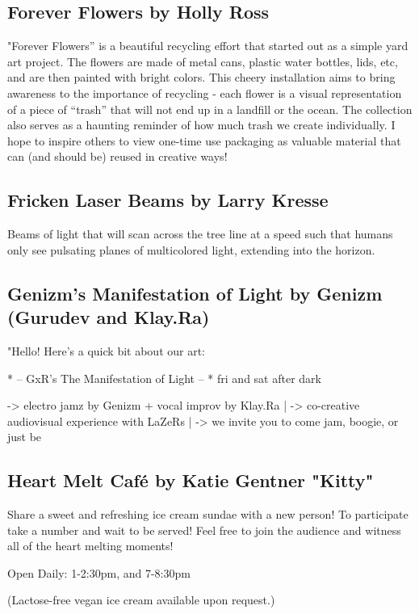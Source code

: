 \begin{multicols}{2}
\subsection*{Forever Flowers by Holly Ross                   }
"Forever Flowers” is a beautiful recycling effort that started out as a simple yard art project.   The flowers are made of metal cans, plastic water bottles, lids, etc, and are then painted with bright colors.  This cheery installation aims to bring awareness to the importance of recycling - each flower is a visual representation of a piece of “trash” that will not end up in a landfill or the ocean.  The collection also serves as a haunting reminder of how much trash we create individually. I hope to inspire others to view one-time use packaging as valuable material that can (and should be) reused in creative ways! 


\subsection*{Fricken Laser Beams by Larry Kresse        }
Beams of light that will scan across the tree line at a speed such that humans only see pulsating planes of multicolored light, extending into the horizon.         


\subsection*{Genizm's Manifestation of Light by Genizm (Gurudev and Klay.Ra)                }
"Hello! Here's a quick bit about our art:


   * – GxR's The Manifestation of Light – *
             fri and sat after dark


-> electro jamz by Genizm + vocal improv by Klay.Ra |
-> co-creative audiovisual experience with LaZeRs   | 
-> we invite you to come jam, boogie, or just be    


\subsection*{Heart Melt Café by Katie Gentner "Kitty"                 }
Share a sweet and refreshing ice cream sundae with a new person! To participate take a number and wait to be served! Feel free to join the audience and witness all of the heart melting moments! 


Open Daily: 1-2:30pm, and 7-8:30pm


(Lactose-free vegan ice cream available upon request.)



\end{multicols}
